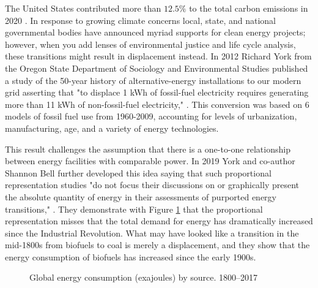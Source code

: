 The United States contributed more than $12.5\%$ to the total carbon emissions
in 2020 \cite{european_commission_joint_research_centre_ghg_2021}. In response
to growing climate concerns local, state, and national governmental bodies have
announced myriad supports for clean energy projects; however, when you add
lenses of environmental justice and life cycle analysis, these transitions might
result in displacement instead. In 2012 Richard York from the Oregon State
Department of Sociology and Environmental Studies published a study of the
50-year history of alternative-energy installations to our modern grid
asserting that "to displace 1 kWh of fossil-fuel electricity requires
generating more than 11 kWh of non-fossil-fuel electricity,"
\cite{york_alternative_2012}. This conversion was based on 6 models of fossil
fuel use from 1960-2009, accounting for levels of urbanization, manufacturing,
age, and a variety of energy technologies.

This result challenges the assumption that there is a one-to-one relationship
between energy facilities with comparable power. In 2019 York and co-author
Shannon Bell further developed this idea saying that such proportional
representation studies "do not focus their discussions on or graphically
present the absolute quantity of energy in their assessments of purported
energy transitions," \cite{york_energy_2019}. They demonstrate with Figure
\ref{fig:percent_total_energy} that the proportional representation misses that
the total demand for energy has dramatically increased since the Industrial
Revolution. What may have looked like a transition in the mid-1800s from
biofuels to coal is merely a displacement, and they show that the energy
consumption of biofuels has increased since the early 1900s.

\begin{figure}[!htbp]
  \hfill
  \caption{
    Global energy consumption (exajoules) by source. 1800--2017
    \cite{york_energy_2019}}
  \label{fig:percent_total_energy}
\end{figure}

